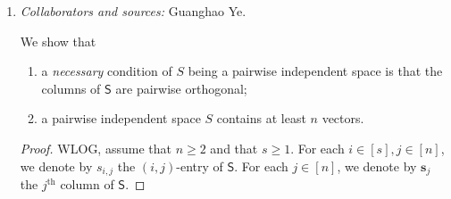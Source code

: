 \documentclass[letterpaper, reqno,11pt]{article}
\newcommand{\PP}{\mathop{{}\mathbb{P}}}
\begin{document}
\begin{enumerate}
\begin{enumerate}
\begin{proof}
      Now, let $S, S' \subset [\ell]$ be such that $S \neq S'$, $S \neq \emptyset$ and $S' \neq \emptyset$. Let $b, b' \in \{ -1, 1 \}$. Then
      \begin{align}
        \PP\left[C_S = b, C_{S'} = b'\right] &= \sum_{\beta \in \{ -1, 1 \}} \PP\left[C_{S \cap S'} = \beta\right] \PP\left[C_S = b, C_{S'} = b' \;\middle|\; C_{S \cap S'} = \beta\right] \nonumber \\
        &= \sum_{\beta \in \{ -1, 1 \}} \PP\left[C_{S \cap S'} = \beta\right] \PP\left[C_{S \setminus S'} = b \beta, C_{S' \setminus S} = b' \beta\right] \nonumber \\
        &= \sum_{\beta \in \{ -1, 1 \}} \PP\left[C_{S \cap S'} = \beta\right] \PP\left[C_{S \setminus S'} = b \beta\right] \PP\left[C_{S' \setminus S} = b' \beta\right] \label{eq:1a-indep} \\
        &= \sum_{\beta \in \{ -1, 1 \}} \frac{1}{2} \cdot \frac{1}{2} \cdot \frac{1}{2} = 2 \cdot \frac{1}{8} = \frac{1}{4} = \frac{1}{2} \cdot \frac{1}{2} = \PP\left[C_S = b\right] \PP\left[C_S = b'\right]. \nonumber
      \end{align}
      Note that \eqref{eq:1a-indep} follows from the fact that $S \setminus S'$ and $S' \setminus S$ are disjoint and thus that $C_{S \setminus S'}$ and $C_{S' \setminus S}$ are independent. This completes the proof that the $n = 2^{\ell} - 1$ random bits $C_S$ for $S \subset [\ell]$ with $S \neq \emptyset$ are pairwise independent.
    \end{proof}

    \clearpage

    \item \noindent\emph{Collaborators and sources:} Guanghao Ye.

    \bigskip

    We show that
    \begin{enumerate}[itemsep=0pt, label=(\roman*)]
      \item a \emph{necessary} condition of $S$ being a pairwise independent space is that the columns of $\mathsf{S}$ are pairwise orthogonal;
      \item a pairwise independent space $S$ contains at least $n$ vectors.
    \end{enumerate}

    \begin{proof}
      WLOG, assume that $n \geq 2$ and that $s \geq 1$. For each $i \in [s], j \in [n]$, we denote by $s_{i, j}$ the $(i, j)$-entry of $\mathsf{S}$. For each $j \in [n]$, we denote by $\mathbf s_j$ the $j^\text{th}$ column of $\mathsf{S}$.
      

\end{proof}
\end{enumerate}
\end{enumerate}
\end{document}

